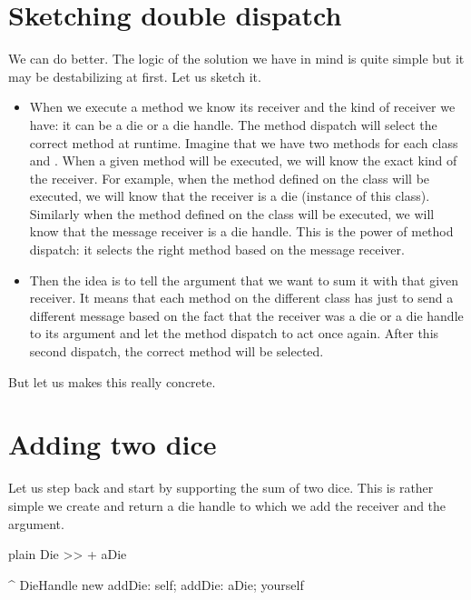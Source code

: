 \documentclass[10pt,twoside,english]{_support/latex/sbabook/sbabook}
\begin{document}
\section{Sketching double dispatch}
We can do better.  The logic of the solution we have in mind is quite simple but it may be destabilizing at first.
Let us sketch it.

\begin{itemize}
\item When we execute a method we know its receiver and the kind of receiver we have: it can be a die or a die handle. The method dispatch will select the correct method at runtime. Imagine that we have two \textcode{+} methods for each class  and . When a given method \textcode{+} will be executed, we will know the exact kind of  the receiver. For example, when the method \textcode{+} defined on the class  will be executed, we will know that the receiver is a die (instance of this class). Similarly when the method \textcode{+} defined on the class  will be executed, we will know that the message receiver is a die handle. This is the power of method dispatch: it selects the right method based on the message receiver.
\end{itemize}

\begin{itemize}
\item Then the idea is to tell the argument that we want to sum it with that given receiver. It means that each \textcode{+} method on the different class has just to send a different message based on the fact that the receiver was a die or a die handle to its argument and let the method dispatch to act once again. After this second dispatch, the correct method will be selected. 
\end{itemize}

But let us makes this really concrete.
\section{Adding two dice}
Let us step back and start by supporting the sum of two dice. This is rather simple we create and return a die 
handle to which we add the receiver and the argument.

\begin{displaycode}{plain}
Die >> + aDie
	
	^ DieHandle new 
		addDie: self; 
		addDie: aDie; yourself
\end{displaycode}
\end{document}
